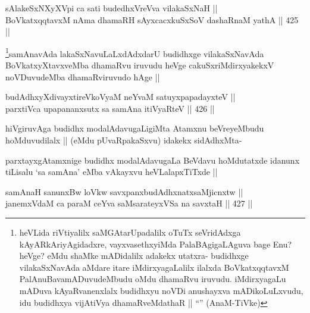 
\begin{shl}
sAlakeSxNXyXV\s pi ca sati budedhxVreVva vilakaSxNaH || \\
BoVkatxqqtavxM nAma dhamaRH sAyxcacxkuSxSoV dashaRnaM yathA ||  425 ||  
\end{shl}

\begin{artha}
\footnote{heVLida riVtiyalilx saMGAtarUpadalilx oTuTx seVridAdxga kAyARkAriyAgidadxre, vayxvasethxyiMda PalaBAgigaLAguva bage Enu? heVge? eMdu shaMke mADidalilx adakekx utatxra- budidhxge vilakaSxNavAda aMdare itare iMdirxyagaLalilx  ilalxda BoVkatxqqtavxM PalAnuBavamADuvudeMbudu oMdu dhamaRvu iruvudu. iMdirxyagaLu mADuva kAyaRvanenxlalx budidhxyu noVDi anushayxva mADikoLuLxvudu, idu budidhxya vijAtiVya dhamaRveMdathaR || ``\stext'' (AnaM-TiVke)}samAnavAda lakaSxNavuLaLxdAdxdarU budidhxge vilakaSxNavAda BoVkatxyXtavxveMba dhamaRvu iruvudu heVge cakuSxriMdirxyakekxV noVDuvudeMba dhamaRviruvudo hAge ||
\end{artha}

\begin{shl}
budAdhxyXdivayxtireVkoV\s yaM neYvaM satuyxpapadayxteV || \\
parxtiVca upapananxsutx sa samAna itiVyaRteV ||  426 ||  
\end{shl}

\begin{artha}
hiVgiruvAga  budidhx modalAdavugaLigiMta Atamxnu beVreyeMbudu hoMduvudilalx || (eMdu pUvaRpakaSxvu) idakekx sidAdhxMta- 
\end{artha}

\begin{artha}
parxtayxgAtamxnige budidhx modalAdavugaLa BeVdavu hoMdutatxde idanunx tiLisalu `sa samAna' eMba vAkayxvu heVLalapxTiTxde ||
\end{artha}

\begin{shl}
samAnaH sanunxBw loVkw savxpanxbudAdhxnatxsaMjicnxtw || \\
janemxVdaM ca paraM ceYva saMsarateyxVSa na savxtaH ||  427 ||  
\end{shl}

